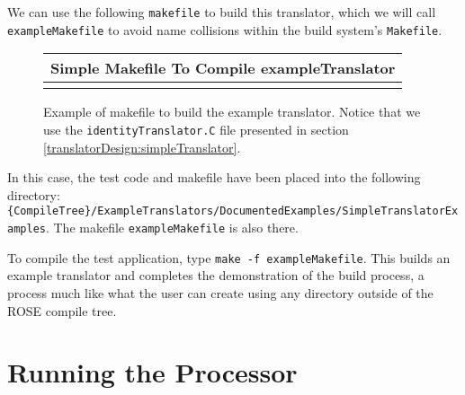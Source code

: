    We can use the following {\tt makefile} to build this translator, which we will call
{\tt exampleMakefile} to avoid name collisions within the build system's {\tt Makefile}.

{\indent
{\mySmallFontSize

\begin{latexonly}
%  
\begin{figure}[tb]
\begin{center}
\begin{tabular}{|c|} \hline
     Simple Makefile To Compile exampleTranslator
\\\hline\hline
   
\\\hline
\end{tabular}
\end{center}
\caption{ Example of makefile to build the example translator. Notice that we use the
    {\tt identityTranslator.C} file presented in section \ref{translatorDesign:simpleTranslator}. }
\end{figure}
\end{latexonly}

\begin{htmlonly}
   
\end{htmlonly}

\label{usingRose:simpleTranslator}

}
}

   In this case, the test code and makefile have been placed into the following directory:
{\tt \{CompileTree\}/ExampleTranslators/DocumentedExamples/SimpleTranslatorExamples}.
The makefile {\tt exampleMakefile} is also there.


To compile the test application, type {\tt make -f exampleMakefile}.  This builds an 
example translator and completes the demonstration of the build process, a process 
much like what the user can create using any directory outside of the ROSE compile tree.

\section{Running the Processor}

